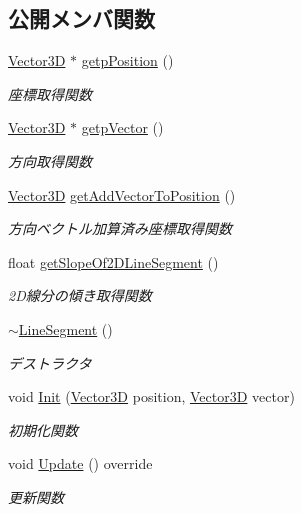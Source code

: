 \subsection*{公開メンバ関数}
\begin{DoxyCompactItemize}
\item 
\mbox{\hyperlink{class_vector3_d}{Vector3D}} $\ast$ \mbox{\hyperlink{class_line_segment_ab32e8ccf6167f28f75382c94c6c7873d}{getp\+Position}} ()
\begin{DoxyCompactList}\small\item\em 座標取得関数 \end{DoxyCompactList}\item 
\mbox{\hyperlink{class_vector3_d}{Vector3D}} $\ast$ \mbox{\hyperlink{class_line_segment_a773f1be1684f80f3f1ed6623462f76c6}{getp\+Vector}} ()
\begin{DoxyCompactList}\small\item\em 方向取得関数 \end{DoxyCompactList}\item 
\mbox{\hyperlink{class_vector3_d}{Vector3D}} \mbox{\hyperlink{class_line_segment_af4c9249a6a1c6c75b12962ef29e6dd30}{get\+Add\+Vector\+To\+Position}} ()
\begin{DoxyCompactList}\small\item\em 方向ベクトル加算済み座標取得関数 \end{DoxyCompactList}\item 
float \mbox{\hyperlink{class_line_segment_a473738a0b67e449cf8b5a23f1146f446}{get\+Slope\+Of2\+D\+Line\+Segment}} ()
\begin{DoxyCompactList}\small\item\em 2\+D線分の傾き取得関数 \end{DoxyCompactList}\item 
\mbox{\hyperlink{class_line_segment_a80a0c88079f054dedc3b9d98717957d7}{$\sim$\+Line\+Segment}} ()
\begin{DoxyCompactList}\small\item\em デストラクタ \end{DoxyCompactList}\item 
void \mbox{\hyperlink{class_line_segment_a38c6ff9ade1d084219ea9c9ae88eb5c7}{Init}} (\mbox{\hyperlink{class_vector3_d}{Vector3D}} position, \mbox{\hyperlink{class_vector3_d}{Vector3D}} vector)
\begin{DoxyCompactList}\small\item\em 初期化関数 \end{DoxyCompactList}\item 
void \mbox{\hyperlink{class_line_segment_af38555a54ae3cae5e06876331b9d7522}{Update}} () override
\begin{DoxyCompactList}\small\item\em 更新関数 \end{DoxyCompactList}\end{DoxyCompactItemize}
